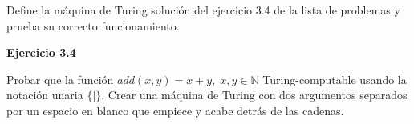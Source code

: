 Define la máquina de Turing solución del ejercicio 3.4 de la lista de problemas y prueba su correcto funcionamiento.

\textbf{Ejercicio 3.4}

Probar que la función \( add(x,y)=x+y , \; x,y \in \mathbb{N} \) Turing-computable usando la notación unaria \( \{ | \} \).
Crear una máquina de Turing con dos argumentos separados por un espacio en blanco que empiece y acabe detrás de las cadenas.



